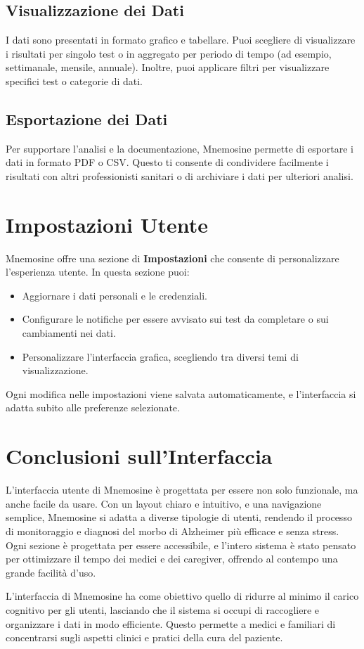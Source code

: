 \documentclass[a4paper,12pt]{book}
\begin{document}
	\subsection{Visualizzazione dei Dati}
	I dati sono presentati in formato grafico e tabellare. Puoi scegliere di visualizzare i risultati per singolo test o in aggregato per periodo di tempo (ad esempio, settimanale, mensile, annuale). Inoltre, puoi applicare filtri per visualizzare specifici test o categorie di dati.
	
	\subsection{Esportazione dei Dati}
	Per supportare l'analisi e la documentazione, Mnemosine permette di esportare i dati in formato PDF o CSV. Questo ti consente di condividere facilmente i risultati con altri professionisti sanitari o di archiviare i dati per ulteriori analisi.
	
	\section{Impostazioni Utente}
	Mnemosine offre una sezione di \textbf{Impostazioni} che consente di personalizzare l’esperienza utente. In questa sezione puoi:
	\begin{itemize}
		\item Aggiornare i dati personali e le credenziali.
		\item Configurare le notifiche per essere avvisato sui test da completare o sui cambiamenti nei dati.
		\item Personalizzare l’interfaccia grafica, scegliendo tra diversi temi di visualizzazione.
	\end{itemize}
	
	Ogni modifica nelle impostazioni viene salvata automaticamente, e l’interfaccia si adatta subito alle preferenze selezionate.
	
	\section{Conclusioni sull'Interfaccia}
	L’interfaccia utente di Mnemosine è progettata per essere non solo funzionale, ma anche facile da usare. Con un layout chiaro e intuitivo, e una navigazione semplice, Mnemosine si adatta a diverse tipologie di utenti, rendendo il processo di monitoraggio e diagnosi del morbo di Alzheimer più efficace e senza stress. Ogni sezione è progettata per essere accessibile, e l’intero sistema è stato pensato per ottimizzare il tempo dei medici e dei caregiver, offrendo al contempo una grande facilità d'uso.
	
	L'interfaccia di Mnemosine ha come obiettivo quello di ridurre al minimo il carico cognitivo per gli utenti, lasciando che il sistema si occupi di raccogliere e organizzare i dati in modo efficiente. Questo permette a medici e familiari di concentrarsi sugli aspetti clinici e pratici della cura del paziente.
	
\end{document}
